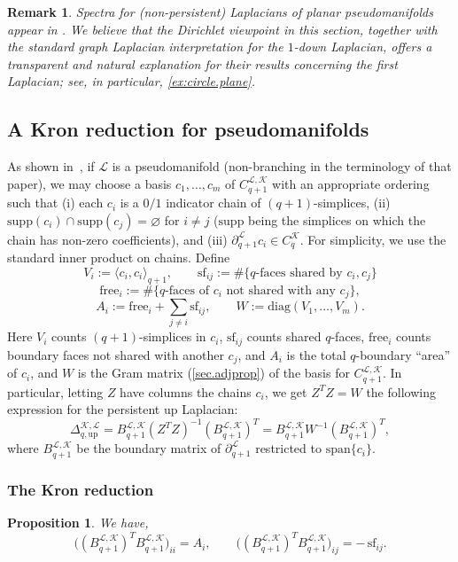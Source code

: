 \documentclass{article}
\newtheorem{proposition}{Proposition}[section]
\newtheorem{remark}{Remark}[section]
\newcommand{\KK}{\mathcal{K}}
\newcommand{\LL}{\mathcal{L}}
\begin{document}
\begin{remark}
\label{rem.schaub}
Spectra for (non-persistent) Laplacians of planar pseudomanifolds
appear in \cite{grande2024disentangling}.  We believe that the Dirichlet
viewpoint in this section, together with the standard graph Laplacian interpretation for the $1$-down Laplacian, offers a transparent and natural explanation for their results concerning the first Laplacian; see, in particular, \cref{ex:circle.plane}.
\end{remark}

\subsection{A Kron reduction for pseudomanifolds}\label{sec:kron}
As shown in~\cite{MR5053447}, if $\LL$ is a pseudomanifold (non-branching in the terminology of that paper), we may choose a basis 
$c_1,\dots,c_m$ of $C_{q+1}^{\LL, \KK}$ with an appropriate ordering such that  
(i) each $c_i$ is a $0/1$ indicator chain of $(q+1)$-simplices,  
(ii) $\mathrm{supp}(c_i)\cap\mathrm{supp}(c_j)=\varnothing$ for $i\neq j$ ($\mathrm{supp}$ being the simplices on which the chain has non-zero coefficients), and  
(iii) $\partial_{q+1}^\LL c_i\in C_{q}^\KK$.  
For simplicity, we use the standard inner product on chains. Define
\[
V_i:=\langle c_i,c_i\rangle_{q+1},\qquad
\mathrm{sf}_{ij}:=\#\{\text{$q$-faces shared by $c_i,c_j$}\}
\]
\[
\mathrm{free}_i:=\#\{\text{$q$-faces of $c_i$ not shared with any $c_j$}\},
\]
\[
A_i:=\mathrm{free}_i+\sum_{j\neq i}\mathrm{sf}_{ij},\qquad
W:= \mathrm{diag}(V_1,\dots,V_m).
\]
Here $V_i$ counts $(q+1)$-simplices in $c_i$, $\mathrm{sf}_{ij}$ counts shared $q$-faces,
$\mathrm{free}_i$ counts boundary faces not shared with another $c_j$, and $A_i$ is the total
$q$-boundary ``area'' of $c_i$, and $W$ is the Gram matrix (\cref{sec.adjprop}) of the basis for $C_{q+1}^{\LL, \KK}.$ In particular, letting $Z$ have columns the chains $c_i$, we get $Z^TZ = W$ the following expression for the persistent up Laplacian:
\[\Delta_{q, \mathrm{up}}^{\KK, \LL}
=
B_{q+1}^{\LL, \KK}(Z^TZ)^{-1}(B_{q+1}^{\LL, \KK})^T 
= B_{q+1}^{\LL, \KK}W^{-1}(B_{q+1}^{\LL, \KK})^T,
\]
where $B^{\LL,\KK}_{q+1}$ be the boundary matrix of $\partial_{q+1}^\LL$ restricted to $\mathrm{span}\{c_i\}$.
\subsubsection{The Kron reduction}
\begin{proposition}
\label{kron.shared}
We have,
\[
\bigl((B^{\LL,\KK}_{q+1})^{T} B^{\LL,\KK}_{q+1}\bigr)_{ii}=A_i,
\qquad
\bigl((B^{\LL,\KK}_{q+1})^{T} B^{\LL,\KK}_{q+1}\bigr)_{ij}=-\,\mathrm{sf}_{ij}.
\]
\end{proposition}
\end{document}
